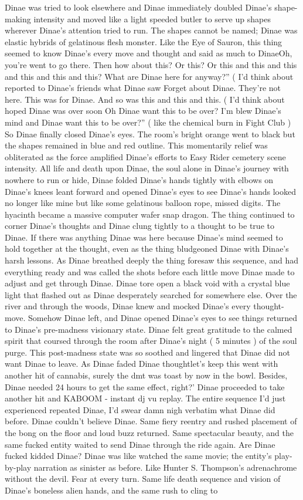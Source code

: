 \documentclass[12pt]{book}
\begin{document}
Dinae was tried to look elsewhere and Dinae immediately doubled Dinae's shape-making intensity and moved like a light speeded butler to serve up shapes wherever Dinae's attention tried to run. The shapes cannot be named; Dinae was elastic hybrids of gelatinous flesh monster. Like the Eye of Sauron, this thing seemed to know Dinae's every move and thought and said as much to DinaeOh, you're went to go there. Then how about this? Or this? Or this and this and this and this and this and this? What are Dinae here for anyway?'' ( I'd think about reported to Dinae's friends what Dinae saw Forget about Dinae. They're not here. This was for Dinae. And so was this and this and this. ( I'd think about hoped Dinae was over soon Oh Dinae want this to be over? I'm blew Dinae's mind and Dinae want this to be over?'' ( like the chemical burn in Fight Club ) So Dinae finally closed Dinae's eyes. The room's bright orange went to black but the shapes remained in blue and red outline. This momentarily relief was obliterated as the force amplified Dinae's efforts to Easy Rider cemetery scene intensity. All life and death upon Dinae, the soul alone in Dinae's journey with nowhere to run or hide, Dinae folded Dinae's hands tightly with elbows on Dinae's knees leant forward and opened Dinae's eyes to see Dinae's hands looked no longer like mine but like some gelatinous balloon rope, missed digits. The hyacinth became a massive computer wafer snap dragon. The thing continued to corner Dinae's thoughts and Dinae clung tightly to a thought to be true to Dinae. If there was anything Dinae was here because Dinae's mind seemed to hold together at the thought, even as the thing bludgeoned Dinae with Dinae's harsh lessons. As Dinae breathed deeply the thing foresaw this sequence, and had everything ready and was called the shots before each little move Dinae made to adjust and get through Dinae. Dinae tore open a black void with a crystal blue light that flashed out as Dinae desperately searched for somewhere else. Over the river and through the woods, Dinae knew and mocked Dinae's every thought-move. Somehow Dinae left, and Dinae opened Dinae's eyes to see things returned to Dinae's pre-madness visionary state. Dinae felt great gratitude to the calmed spirit that coursed through the room after Dinae's night ( 5 minutes ) of the soul purge. This post-madness state was so soothed and lingered that Dinae did not want Dinae to leave. As Dinae faded Dinae thoughtlet's keep this went with another hit of cannabis, surely the dmt was toast by now in the bowl. Besides, Dinae needed 24 hours to get the same effect, right?' Dinae proceeded to take another hit and KABOOM - instant dj vu replay. The entire sequence I'd just experienced repeated Dinae, I'd swear damn nigh verbatim what Dinae did before. Dinae couldn't believe Dinae. Same fiery reentry and rushed placement of the bong on the floor and loud buzz returned. Same spectacular beauty, and the same fucked entity waited to send Dinae through the ride again. Are Dinae fucked kidded Dinae? Dinae was like watched the same movie; the entity's play-by-play narration as sinister as before. Like Hunter S. Thompson's adrenachrome without the devil. Fear at every turn. Same life death sequence and vision of Dinae's boneless alien hands, and the same rush to cling to 
\end{document}
